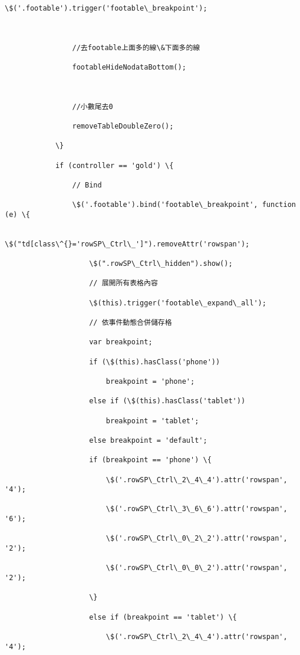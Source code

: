 \documentclass[11pt]{article}
\begin{document}
\begin{Verbatim}[commandchars=\\\{\}]
                \$('.footable').trigger('footable\_breakpoint');



                //去footable上面多的線\&下面多的線

                footableHideNodataBottom();



                //小數尾去0

                removeTableDoubleZero();

            \}

            if (controller == 'gold') \{

                // Bind

                \$('.footable').bind('footable\_breakpoint', function (e) \{

                    \$("td[class\^{}='rowSP\_Ctrl\_']").removeAttr('rowspan');

                    \$(".rowSP\_Ctrl\_hidden").show();

                    // 展開所有表格內容

                    \$(this).trigger('footable\_expand\_all');

                    // 依事件動態合併儲存格

                    var breakpoint;

                    if (\$(this).hasClass('phone'))

                        breakpoint = 'phone';

                    else if (\$(this).hasClass('tablet'))

                        breakpoint = 'tablet';

                    else breakpoint = 'default';

                    if (breakpoint == 'phone') \{

                        \$('.rowSP\_Ctrl\_2\_4\_4').attr('rowspan', '4');

                        \$('.rowSP\_Ctrl\_3\_6\_6').attr('rowspan', '6');

                        \$('.rowSP\_Ctrl\_0\_2\_2').attr('rowspan', '2');

                        \$('.rowSP\_Ctrl\_0\_0\_2').attr('rowspan', '2');

                    \}

                    else if (breakpoint == 'tablet') \{

                        \$('.rowSP\_Ctrl\_2\_4\_4').attr('rowspan', '4');


\end{Verbatim}
\end{document}
